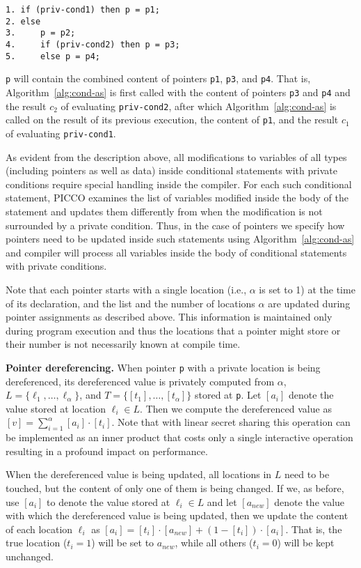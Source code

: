 \documentclass[11pt]{article}
\begin{document}
{\small \begin{verbatim}
1. if (priv-cond1) then p = p1;
2. else
3.     p = p2;
4.     if (priv-cond2) then p = p3;
5.     else p = p4; 
\end{verbatim}}
\noindent \texttt{p} will contain the combined content of pointers
\texttt{p1}, \texttt{p3}, and \texttt{p4}. That is,
Algorithm~\ref{alg:cond-as} is first called with the content of pointers
\texttt{p3} and \texttt{p4} and the result $c_2$ of evaluating
\texttt{priv-cond2}, after which Algorithm~\ref{alg:cond-as} is called on
the result of its previous execution, the content of \texttt{p1}, and the
result $c_1$ of evaluating \texttt{priv-cond1}.

As evident from the description above, all modifications to variables of
all types (including pointers as well as data) inside conditional statements
with private conditions require special handling inside the compiler. For
each such conditional statement, PICCO examines the list of variables
modified inside the body of the statement and updates them differently from
when the modification is not surrounded by a private condition. Thus, in the
case of pointers we specify how pointers need to be updated inside such
statements using Algorithm~\ref{alg:cond-as} and compiler will process all
variables inside the body of conditional statements with private conditions.

Note that each pointer starts with a single location (i.e., $\alpha$
is set to 1) at the time of its declaration, and the list and the
number of locations $\alpha$ are updated during pointer assignments as
described above. This information is maintained only during program
execution and thus the locations that a pointer might store or their
number is not necessarily known at compile time.

\medskip \noindent \textbf{Pointer dereferencing.} When pointer \texttt{p}
with a private location is being dereferenced, its dereferenced value is
privately computed from $\alpha$, $L = \{\ell_1, {\ldots}, \ell_\alpha\}$,
and $T = \{[t_1], {\ldots}, [t_\alpha]\}$ stored at \texttt{p}. Let $[a_i]$
denote the value stored at location $\ell_i \in L$. Then we compute the
dereferenced value as $[v] = \sum_{i=1}^\alpha [a_i] \cdot [t_i]$. Note that
with linear secret sharing this operation can be implemented as an inner
product that costs only a single interactive operation resulting in a
profound impact on performance.

When the dereferenced value is being updated, all locations in $L$ need to
be touched, but the content of only one of them is being changed. If we, as
before, use $[a_i]$ to denote the value stored at $\ell_i \in L$ and let
$[a_{new}]$ denote the value with which the dereferenced value is being
updated, then we update the content of each location $\ell_i$ as $[a_i] =
[t_i] \cdot [a_{new}] + (1-[t_i]) \cdot [a_i]$. That is, the true location
($t_i = 1$) will be set to $a_{new}$, while all others ($t_i = 0$) will be
kept unchanged.
\end{document}
